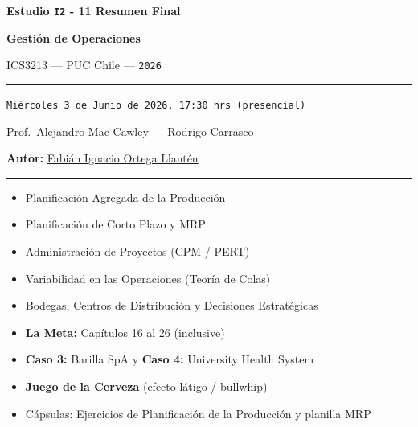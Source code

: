 \documentclass[11pt, a4paper]{article}
\begin{document}
\begin{titlepage}
  \centering
  \vspace*{2cm}
  {\Huge\bfseries\color{gopcyan} Estudio \texttt{I2} - 11 Resumen Final\par}
  \vspace{0.4cm}
  {\LARGE\bfseries Gestión de Operaciones\par}
  \vspace{0.3cm}
  {\large ICS3213 --- PUC Chile --- \texttt{2026}\par}
  \vspace{1.2cm}
  \rule{\textwidth}{0.4pt}
  \vspace{0.4cm}

  {\normalsize \texttt{Miércoles 3 de Junio de 2026, 17:30 hrs (presencial)}\par}
  \vspace{0.2cm}
  {\small Prof.\ Alejandro Mac Cawley --- Rodrigo Carrasco\par}
  \vspace{0.2cm}
  {\small\textbf{Autor:} \href{https://cl.linkedin.com/in/fabian-ortega-llanten}{Fabián Ignacio Ortega Llantén}\par}
  \vspace{0.4cm}
  \rule{\textwidth}{0.4pt}
  \vspace{1cm}

  \begin{resumentemario}
    \begin{itemize}[leftmargin=1.2em, itemsep=2pt]
      \item Planificación Agregada de la Producción
      \item Planificación de Corto Plazo y MRP
      \item Administración de Proyectos (CPM / PERT)
      \item Variabilidad en las Operaciones (Teoría de Colas)
      \item Bodegas, Centros de Distribución y Decisiones Estratégicas
      \item \textbf{La Meta:} Capítulos 16 al 26 (inclusive)
      \item \textbf{Caso 3:} Barilla SpA \quad y \quad \textbf{Caso 4:} University Health System
      \item \textbf{Juego de la Cerveza} (efecto látigo / bullwhip)
      \item Cápsulas: Ejercicios de Planificación de la Producción y planilla MRP
    \end{itemize}
  \end{resumentemario}


\end{titlepage}
\end{document}
